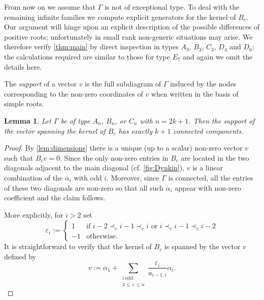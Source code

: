 \documentclass[pdftex]{sigma}
\numberwithin{equation}{section}
\numberwithin{figure}{section}
\newtheorem{Lemma}[Theorem]{Lemma}
\begin{document}
  From now on we assume that $\Gamma$ is not of exceptional type.
  To deal with the remaining infinite families we compute explicit generators for the kernel of $B_c$.
  Our argument will hinge upon an explicit description of the possible differences of positive roots; unfortunately in small rank non-generic situations may arise.
  We therefore verify \cref{thm:main} by direct inspection in types $A_3$, $B_3$, $C_3$, $D_4$ and $D_6$; the calculations required are similar to those for type $E_7$ and again we omit the details here.

  \begin{Definition}
    The \emph{support} of a vector $v$ is the full subdiagram of $\Gamma$ induced by the nodes corresponding to the non-zero coordinates of $v$ when written in the basis of simple roots.
  \end{Definition}

  \begin{Lemma}
    Let $\Gamma$ be of type $A_n$, $B_n$, or $C_n$ with $n=2k+1$.
    Then the support of the vector spanning the kernel of $B_c$ has exactly $k+1$ connected components.
  \end{Lemma}
  \begin{proof}
    By \cref{lem:dimensions} there is a unique (up to a scalar) non-zero vector $v$ such that $B_cv=0$.
    Since the only non-zero entries in $B_c$ are located in the two diagonals adjacent to the main diagonal (cf. \cref{fig:Dynkin}), $v$ is a linear combination of the $\alpha_i$ with odd $i$.
    Moreover, since $\Gamma$ is connected, all the entries of these two diagonals are non-zero so that all such $\alpha_i$ appear with non-zero coefficient and the claim follows.

    More explicitly, for $i>2$ set
    \[
      \varepsilon_i :=
      \begin{cases}
        1 & \text{if $i-2\prec_c i-1 \prec_c i$ or $i\prec_c i-1 \prec_c i-2$}\\
        -1 & \text{otherwise.}
      \end{cases}
    \]
    It is straightforward to verify that the kernel of $B_c$ is spanned by the vector $v$ defined by
    \begin{equation}
      \label{eq:vector}
      v :=
      \alpha_1 + \sum_{\substack{i\ \mathrm{odd}\\ 3\le\, i\,\leq n}} \frac{\varepsilon_i}{a_{i-1,i}} \alpha_i.
    \end{equation}
  \end{proof}
\end{document}
